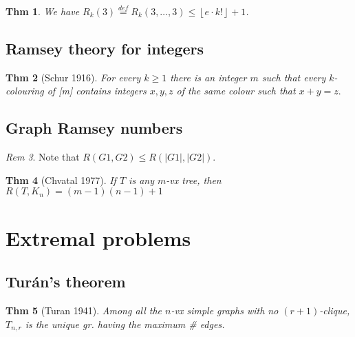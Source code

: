 \documentclass[11pt, fleqn, a4paper, landscape]{article}
\theoremstyle{plain} %
\newtheorem{thm}{Thm}
\theoremstyle{remark} %
\newtheorem{rem}[thm]{Rem}
\theoremstyle{definition} %
\newtheorem{defi}[thm]{Def}
\begin{document}
\begin{multicols}{5}
\begin{thm}
We have $R_k(3)\stackrel{def}{=}R_k(3,\dots,3)\le\left\lfloor e\cdot k!\right\rfloor+1$.
\end{thm}

\subsection{Ramsey theory for integers}

\begin{thm}[Schur 1916]
For every $k \ge 1$ there is an integer $m$ such that every $k$-colouring of [m] contains integers $x, y, z$ of the same colour such that $x + y = z.$
\end{thm}

\subsection{Graph Ramsey numbers}
\addtocounter{thm}{1}
\begin{rem}
Note that $R(G1,G2) \le R(|G1|,|G2|)$.
\end{rem}

\begin{thm}[Chvatal 1977]
If $T$ is any $m$-vx tree, then $R(T,K_n) = (m - 1)(n - 1) + 1$
\end{thm}

\section{Extremal problems}
\addtocounter{thm}{1}

\addtocounter{thm}{2}
\subsection{Turán’s theorem}
\addtocounter{thm}{1}
\begin{thm}[Turan 1941]
Among all the $n$-vx simple graphs with no $(r + 1)$-clique, $T_{n,r}$ is
the unique gr. having the maximum \# edges.
\end{thm} 


\end{multicols}
\end{document}
